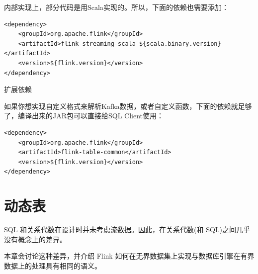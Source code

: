 \documentclass[cn,11pt,chinese]{elegantbook}
\begin{document}
内部实现上，部分代码是用Scala实现的。所以，下面的依赖也需要添加：

\begin{verbatim}
<dependency>
    <groupId>org.apache.flink</groupId>
    <artifactId>flink-streaming-scala_${scala.binary.version}</artifactId>
    <version>${flink.version}</version>
</dependency>
\end{verbatim}

扩展依赖

如果你想实现自定义格式来解析Kafka数据，或者自定义函数，下面的依赖就足够了，编译出来的JAR包可以直接给SQL Client使用：

\begin{verbatim}
<dependency>
    <groupId>org.apache.flink</groupId>
    <artifactId>flink-table-common</artifactId>
    <version>${flink.version}</version>
</dependency>
\end{verbatim}

\section{动态表}

SQL 和关系代数在设计时并未考虑流数据。因此，在关系代数(和 SQL)之间几乎没有概念上的差异。

本章会讨论这种差异，并介绍 Flink 如何在无界数据集上实现与数据库引擎在有界数据上的处理具有相同的语义。

    \begin{table}[htbp]
        \centering
        \caption{DataStream上的关系查询}
          
        \label{tab:theorem-class}%
      \end{table}%
\end{document}
